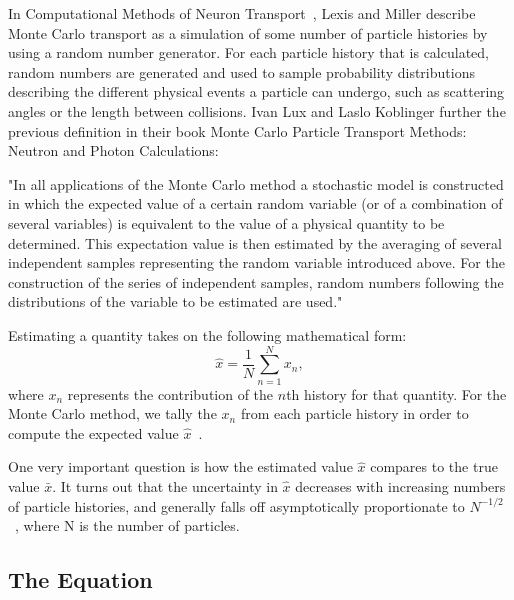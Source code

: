 In Computational Methods of Neuron Transport~\cite{LewisCMNT}, Lexis and Miller describe Monte Carlo transport as a simulation of some number of particle histories by using a random number generator.
%
For each particle history that is calculated, random numbers are generated and used to sample probability distributions describing the different physical events a particle can undergo, such as scattering angles or the length between collisions.
%
Ivan Lux and Laslo Koblinger further the previous definition in their book Monte Carlo Particle Transport Methods: Neutron and Photon Calculations:
%
\begin{displayquote}
"In all applications of the Monte Carlo method a stochastic model is constructed in which the expected value of a certain random variable (or of a combination of several variables) is equivalent to the value of a physical quantity to be determined. This expectation value is then estimated by the averaging of several independent samples representing the random variable introduced above. For the construction of the series of independent samples, random numbers following the distributions of the variable to be estimated are used." ~\cite{LuxMCPTM}
\end{displayquote}

% 
Estimating a quantity takes on the following mathematical form:
$$ \hat{x} = \frac{1}{N} \sum_{n=1}^{N} x_{n}, $$
where $x_{n}$ represents the contribution of the $n$th history for that quantity.
%
For the Monte Carlo method, we tally the $x_{n}$ from each particle history in order to compute the expected value $\hat{x}$~\cite{LewisCMNT}.
%

%
One very important question is how the estimated value $\hat{x}$ compares to the true value $\bar{x}$.
%
It turns out that the uncertainty in $\hat{x}$ decreases with increasing numbers of particle histories, and generally falls off asymptotically proportionate to $N^{-1/2}$~\cite{LewisCMNT}, where N is the number of particles.
%

\subsection{ \textbf{ The Equation} }

